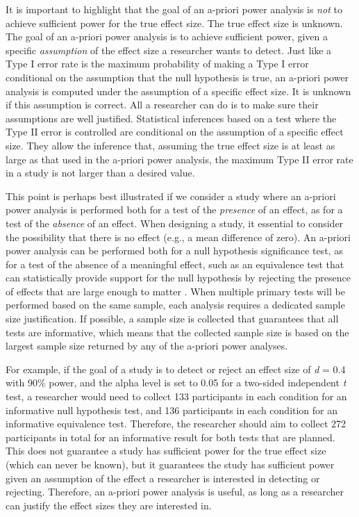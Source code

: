 \documentclass[
]{krantz}
\begin{document}
It is important to highlight that the goal of an a-priori power analysis is \emph{not} to achieve sufficient power for the true effect size. The true effect size is unknown. The goal of an a-priori power analysis is to achieve sufficient power, given a specific \emph{assumption} of the effect size a researcher wants to detect. Just like a Type I error rate is the maximum probability of making a Type I error conditional on the assumption that the null hypothesis is true, an a-priori power analysis is computed under the assumption of a specific effect size. It is unknown if this assumption is correct. All a researcher can do is to make sure their assumptions are well justified. Statistical inferences based on a test where the Type II error is controlled are conditional on the assumption of a specific effect size. They allow the inference that, assuming the true effect size is at least as large as that used in the a-priori power analysis, the maximum Type II error rate in a study is not larger than a desired value.

This point is perhaps best illustrated if we consider a study where an a-priori power analysis is performed both for a test of the \emph{presence} of an effect, as for a test of the \emph{absence} of an effect. When designing a study, it essential to consider the possibility that there is no effect (e.g., a mean difference of zero). An a-priori power analysis can be performed both for a null hypothesis significance test, as for a test of the absence of a meaningful effect, such as an equivalence test that can statistically provide support for the null hypothesis by rejecting the presence of effects that are large enough to matter \citep{meyners_equivalence_2012, lakens_equivalence_2017, rogers_using_1993}. When multiple primary tests will be performed based on the same sample, each analysis requires a dedicated sample size justification. If possible, a sample size is collected that guarantees that all tests are informative, which means that the collected sample size is based on the largest sample size returned by any of the a-priori power analyses.

For example, if the goal of a study is to detect or reject an effect size of \emph{d} = 0.4 with 90\% power, and the alpha level is set to 0.05 for a two-sided independent \emph{t} test, a researcher would need to collect 133 participants in each condition for an informative null hypothesis test, and 136 participants in each condition for an informative equivalence test. Therefore, the researcher should aim to collect 272 participants in total for an informative result for both tests that are planned. This does not guarantee a study has sufficient power for the true effect size (which can never be known), but it guarantees the study has sufficient power given an assumption of the effect a researcher is interested in detecting or rejecting. Therefore, an a-priori power analysis is useful, as long as a researcher can justify the effect sizes they are interested in.
\end{document}
